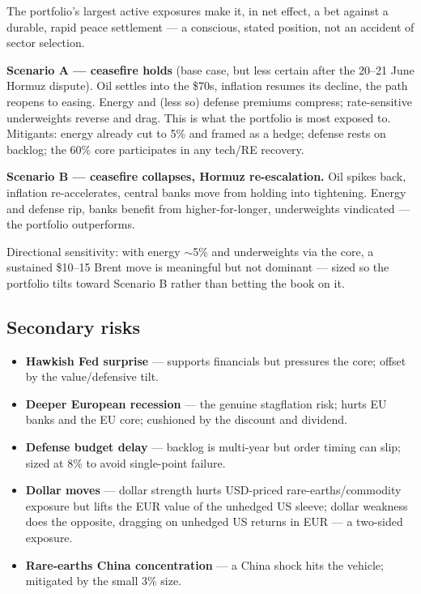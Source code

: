 \documentclass[11pt,a4paper]{article}
\begin{document}
The portfolio's largest active exposures make it, in net effect, a bet against a durable, rapid peace settlement --- a conscious, stated position, not an accident of sector selection.

\textbf{Scenario A --- ceasefire holds} (base case, but less certain after the 20--21 June Hormuz dispute). Oil settles into the \$70s, inflation resumes its decline, the path reopens to easing. Energy and (less so) defense premiums compress; rate-sensitive underweights reverse and drag. This is what the portfolio is most exposed to. Mitigants: energy already cut to 5\% and framed as a hedge; defense rests on backlog; the 60\% core participates in any tech/RE recovery.

\textbf{Scenario B --- ceasefire collapses, Hormuz re-escalation.} Oil spikes back, inflation re-accelerates, central banks move from holding into tightening. Energy and defense rip, banks benefit from higher-for-longer, underweights vindicated --- the portfolio outperforms.

Directional sensitivity: with energy \(\sim\)5\% and underweights via the core, a sustained \$10--15 Brent move is meaningful but not dominant --- sized so the portfolio tilts toward Scenario B rather than betting the book on it.

\subsection{Secondary risks}

\begin{itemize}
\item \textbf{Hawkish Fed surprise} --- supports financials but pressures the core; offset by the value/defensive tilt.
\item \textbf{Deeper European recession} --- the genuine stagflation risk; hurts EU banks and the EU core; cushioned by the discount and dividend.
\item \textbf{Defense budget delay} --- backlog is multi-year but order timing can slip; sized at 8\% to avoid single-point failure.
\item \textbf{Dollar moves} --- dollar strength hurts USD-priced rare-earths/commodity exposure but lifts the EUR value of the unhedged US sleeve; dollar weakness does the opposite, dragging on unhedged US returns in EUR --- a two-sided exposure.
\item \textbf{Rare-earths China concentration} --- a China shock hits the vehicle; mitigated by the small 3\% size.
\end{itemize}
\end{document}
